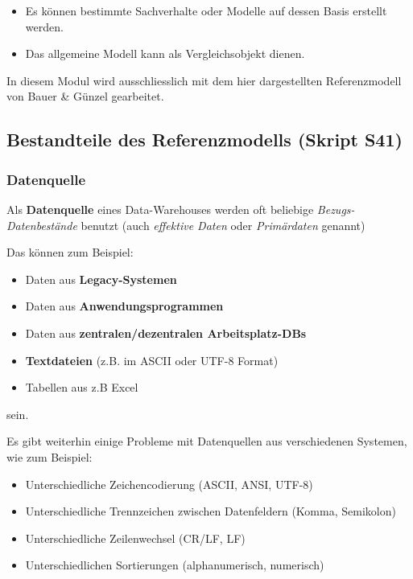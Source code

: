 \documentclass[a4paper, 11pt]{article}
\begin{document}
\begin{itemize}
	\item Es können bestimmte Sachverhalte oder Modelle auf dessen Basis erstellt werden.
	\item Das allgemeine Modell kann als Vergleichsobjekt dienen.
\end{itemize}

In diesem Modul wird ausschliesslich mit dem hier dargestellten Referenzmodell von Bauer \& Günzel gearbeitet.

\vspace{3cm}

\subsection{Bestandteile des Referenzmodells (Skript S41)}
\subsubsection{Datenquelle}
Als \textbf{Datenquelle} eines Data-Warehouses werden oft beliebige\textit{ Bezugs-Datenbestände} benutzt (auch \textit{effektive Daten} oder \textit{Primärdaten} genannt)

Das können zum Beispiel:
\begin{itemize}
	\item Daten aus \textbf{Legacy-Systemen}
	\item Daten aus \textbf{Anwendungsprogrammen}
	\item Daten aus \textbf{zentralen/dezentralen Arbeitsplatz-DBs}
	\item \textbf{Textdateien} (z.B. im ASCII oder UTF-8 Format)
	\item Tabellen aus z.B Excel
\end{itemize}

sein.

\newpage

Es gibt weiterhin einige Probleme mit Datenquellen aus verschiedenen Systemen, wie zum Beispiel:
\begin{itemize}
	\item Unterschiedliche Zeichencodierung (ASCII, ANSI, UTF-8)
	\item Unterschiedliche Trennzeichen zwischen Datenfeldern (Komma, Semikolon)
	\item Unterschiedliche Zeilenwechsel (CR/LF, LF)
	\item Unterschiedlichen Sortierungen (alphanumerisch, numerisch)
\end{itemize}
\end{document}
